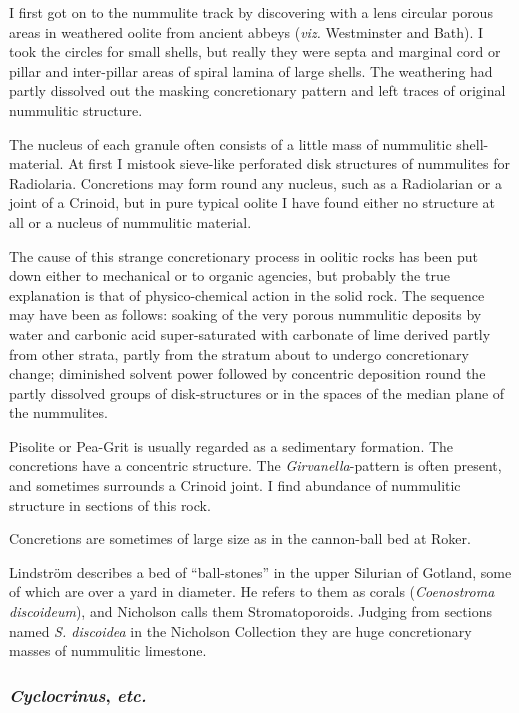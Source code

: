 \documentclass[a4paper, 12pt, oneside]{article}
\begin{document}
I first got on to the nummulite track by discovering with a lens circular porous areas in weathered oolite from ancient abbeys (\emph{viz.} Westminster and Bath). I took the circles for small shells, but really they were septa and marginal cord or pillar and inter-pillar areas of spiral lamina of large shells. The weathering had partly dissolved out the masking concretionary pattern and left traces of original nummulitic structure.

The nucleus of each granule often consists of a little mass of nummulitic shell-material. At first I mistook sieve-like perforated disk structures of nummulites for Radiolaria. Concretions may form round any nucleus, such as a Radiolarian or a joint of a Crinoid, but in pure typical oolite I have found either no structure at all or a nucleus of nummulitic material.

The cause of this strange concretionary process in oolitic rocks has been put down either to mechanical or to organic agencies, but probably the true explanation is that of physico-chemical action in the solid rock. The sequence may have been as follows: soaking of the very porous nummulitic deposits by water and carbonic acid super-saturated with carbonate of lime derived partly from other strata, partly from the stratum about to undergo concretionary change; diminished solvent power followed by concentric deposition round the partly dissolved groups of disk-structures or in the spaces of the median plane of the nummulites.

Pisolite or Pea-Grit is usually regarded as a sedimentary formation. The concretions have a concentric structure. The \emph{Girvanella}-pattern is often present, and sometimes surrounds a Crinoid joint. I find abundance of nummulitic structure in sections of this rock.

Concretions are sometimes of large size as in the cannon-ball bed at Roker.

Lindström describes a bed of ``ball-stones'' in the upper Silurian of Gotland, some of which are over a yard in diameter. He refers to them as corals (\emph{Coenostroma discoideum}), and Nicholson calls them Stromatoporoids. Judging from sections named \emph{S. discoidea} in the Nicholson Collection they are huge concretionary masses of nummulitic limestone.

\subsubsection{\emph{Cyclocrinus}, \emph{etc.}}
\end{document}
